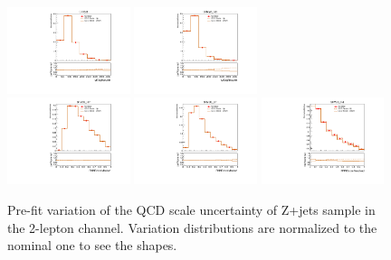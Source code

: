 \begin{figure}[htbp]
\begin{center}
 \includegraphics[width=0.32\textwidth,keepaspectratio]{figures/syst/QCDScale/Z_0ptag1pfat0pjet_0ptv_CRVjet_MTagMerJets_SysTheoryQCD_Z__1up_Norm.pdf}
 \includegraphics[width=0.32\textwidth,keepaspectratio]{figures/syst/QCDScale/Z_0ptag2pjet_0ptv_CRVjet_Fid_MTagResJets_SysTheoryQCD_Z__1up_Norm.pdf}
 \\
 \includegraphics[width=0.32\textwidth,keepaspectratio]{figures/syst/QCDScale/Z_0ptag1pfat0pjet_0ptv_SRVBS_HP_RNNScoreMerged_SysTheoryQCD_Z__1up_Norm.pdf}
 \includegraphics[width=0.32\textwidth,keepaspectratio]{figures/syst/QCDScale/Z_0ptag1pfat0pjet_0ptv_SRVBS_LP_RNNScoreMerged_SysTheoryQCD_Z__1up_Norm.pdf}
 \includegraphics[width=0.32\textwidth,keepaspectratio]{figures/syst/QCDScale/Z_0ptag2pjet_0ptv_SRVBS_Fid_RNNScoreResolved_SysTheoryQCD_Z__1up_Norm.pdf}
 \caption[f]{
Pre-fit variation of the QCD scale uncertainty of Z+jets sample in the 2-lepton channel.  Variation distributions are normalized to the nominal one to see the shapes.
}
\label{fig:QCDZ}
\end{center}
\end{figure}

